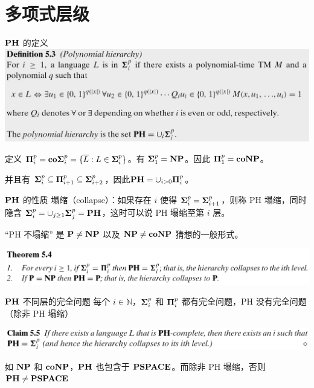 \documentclass[UTF8,aspectratio=169,mathserif]{beamer}
\begin{document}
	\section{多项式层级}
	\begin{frame}{$\bf PH$ 的定义}
		\includegraphics[width=\linewidth]{../5 & 6/note.assets/image-20210426160324184.png}\newline
		
		定义 ${\bf\Pi}_i^p={\bf co\Sigma}_i^p=\{\overline{L}:L\in{\bf\Sigma}_i^p\}$。有 ${\bf\Sigma}_1^p={\bf NP}$。因此 ${{\bf\Pi}_1^p={\bf coNP}}$。
		
		并且有 ${\bf\Sigma}_i^p \subseteq{\bf\Pi}_{i+1}^p\subseteq{\bf\Sigma}_{i+2}^p$，因此${\bf PH}=\cup_{i>0}{\bf\Pi}_i^p$。
	\end{frame}
	
	\begin{frame}{$\bf PH$ 的性质}
		塌缩（collapse）：如果存在 $i$ 使得 ${{\bf\Sigma}_i^p}={{\bf\Sigma}_{i+1}^p}$，则称 PH 塌缩，同时隐含 ${{\bf\Sigma}_i^p}={\cup}_{j\ge1}{{\bf\Sigma}_j^p}={\bf PH}$，这时可以说 PH 塌缩至第 $i$ 层。\newline
		
		“PH 不塌缩” 是 $\bf P\neq NP$ 以及 $\bf NP\neq coNP$ 猜想的一般形式。\newline
		
		\includegraphics[width=\linewidth]{../5 & 6/note.assets/image-20210427092228569.png}
	\end{frame}
	
	\begin{frame}{$\bf PH$ 不同层的完全问题}
		每个 $i\in\mathbb{N}$，${{\bf\Sigma}_i^p}$ 和 ${{\bf\Pi}_i^p}$ 都有完全问题，PH 没有完全问题（除非 PH 塌缩）\newline
		
		\includegraphics[width=\linewidth]{../5 & 6/note.assets/image-20210427092442758.png}\newline
		
		如 $\bf NP$ 和 $\bf coNP$，$\bf PH$ 也包含于 $\bf PSPACE$。而除非 PH 塌缩，否则 $\bf PH\neq PSPACE$
	\end{frame}
	
\end{document}
